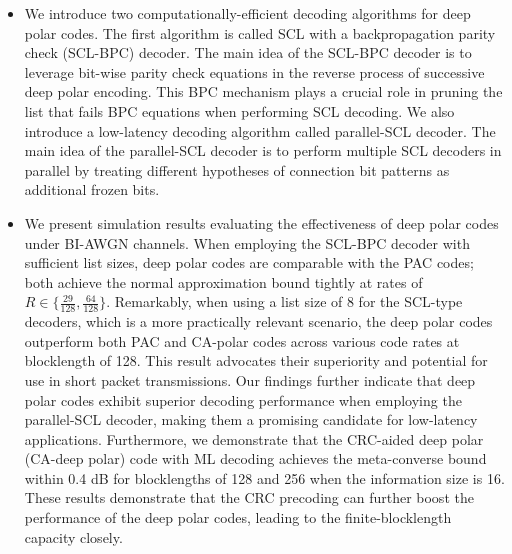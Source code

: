 \documentclass[conference]{IEEEtran}
\begin{document}
\begin{itemize}
                        
        
        
        
 \item  We introduce two computationally-efficient decoding algorithms for deep polar codes. The first algorithm is called SCL with a backpropagation parity check (SCL-BPC) decoder. The main idea of the SCL-BPC decoder is to leverage bit-wise parity check equations in the reverse process of successive deep polar encoding. This BPC mechanism plays a crucial role in pruning the list that fails BPC equations when performing SCL decoding. We also introduce a low-latency decoding algorithm called parallel-SCL decoder. The main idea of the parallel-SCL decoder is to perform multiple SCL decoders in parallel by treating different hypotheses of connection bit patterns as additional frozen bits.                  
                
           
\item We present simulation results evaluating the effectiveness of deep polar codes under BI-AWGN channels. When employing the SCL-BPC decoder with sufficient list sizes, deep polar codes are comparable with the PAC codes; both achieve the normal approximation bound tightly at rates of $R\in \{\frac{29}{128},\frac{64}{128}\}$. Remarkably, when using a list size of 8 for the SCL-type decoders, which is a more practically relevant scenario, the deep polar codes outperform both PAC and CA-polar codes across various code rates at blocklength of 128. This result advocates their superiority and potential for use in short packet transmissions. Our findings further indicate that deep polar codes exhibit superior decoding performance when employing the parallel-SCL decoder, making them a promising candidate for low-latency applications. Furthermore, we demonstrate that the CRC-aided deep polar (CA-deep polar) code with ML decoding achieves the meta-converse bound within 0.4 dB for blocklengths of 128 and 256 when the information size is 16. These results demonstrate that the CRC precoding can further boost the performance of the deep polar codes, leading to the finite-blocklength capacity closely.


\end{itemize}
\end{document}
